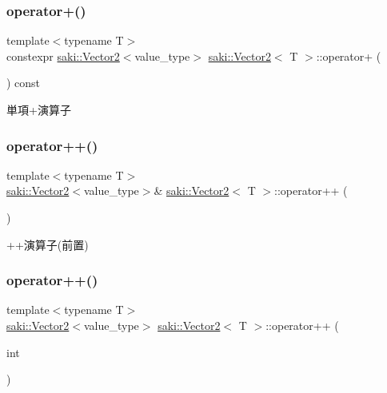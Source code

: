 \subsubsection{\texorpdfstring{operator+()}{operator+()}}
{\footnotesize\ttfamily template$<$typename T$>$ \\
constexpr \mbox{\hyperlink{classsaki_1_1_vector2}{saki\+::\+Vector2}}$<$value\+\_\+type$>$ \mbox{\hyperlink{classsaki_1_1_vector2}{saki\+::\+Vector2}}$<$ T $>$\+::operator+ (\begin{DoxyParamCaption}{ }\end{DoxyParamCaption}) const\hspace{0.3cm}{\ttfamily [inline]}}



単項+演算子 

\mbox{\label{classsaki_1_1_vector2_a7eb1b73a53daafb5da4440b63f9b99d1}} 
\subsubsection{\texorpdfstring{operator++()}{operator++()}\hspace{0.1cm}{\footnotesize\ttfamily [1/2]}}
{\footnotesize\ttfamily template$<$typename T$>$ \\
\mbox{\hyperlink{classsaki_1_1_vector2}{saki\+::\+Vector2}}$<$value\+\_\+type$>$\& \mbox{\hyperlink{classsaki_1_1_vector2}{saki\+::\+Vector2}}$<$ T $>$\+::operator++ (\begin{DoxyParamCaption}{ }\end{DoxyParamCaption})\hspace{0.3cm}{\ttfamily [inline]}}



++演算子(前置) 

\mbox{\label{classsaki_1_1_vector2_a1736752293670457513e7e8e8354e5f8}} 
\subsubsection{\texorpdfstring{operator++()}{operator++()}\hspace{0.1cm}{\footnotesize\ttfamily [2/2]}}
{\footnotesize\ttfamily template$<$typename T$>$ \\
\mbox{\hyperlink{classsaki_1_1_vector2}{saki\+::\+Vector2}}$<$value\+\_\+type$>$ \mbox{\hyperlink{classsaki_1_1_vector2}{saki\+::\+Vector2}}$<$ T $>$\+::operator++ (\begin{DoxyParamCaption}\item[{int}]{ }\end{DoxyParamCaption})\hspace{0.3cm}{\ttfamily [inline]}}




